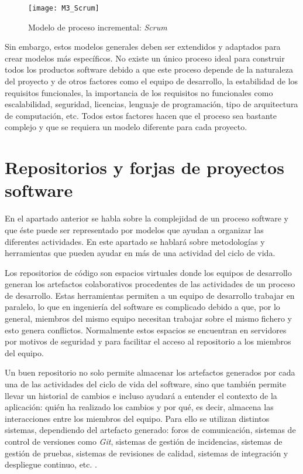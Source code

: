 \begin{figure}[!h]
	\centering
	\texttt{[image: M3\_Scrum]}
	\caption{Modelo de proceso incremental: \textit{Scrum} \cite{scrum_master_scrum_2019}}
	\label{fig:M3_Scrum}
\end{figure}
\FloatBarrier

Sin embargo, estos modelos generales deben ser extendidos y adaptados para crear modelos más específicos. No existe un único proceso ideal para construir todos los productos software debido a que este proceso depende de la naturaleza del proyecto y de otros factores como el equipo de desarrollo, la estabilidad de los requisitos funcionales, la importancia de los requisitos no funcionales como escalabilidad, seguridad, licencias, lenguaje de programación, tipo de arquitectura de computación, etc. Todos estos factores hacen que el proceso sea bastante complejo y que se requiera un modelo diferente para cada proyecto.


\section{Repositorios y forjas de proyectos software}
En el apartado anterior se habla sobre la complejidad de un proceso software y que éste puede ser representado por modelos que ayudan a organizar las diferentes actividades. En este apartado se hablará sobre metodologías y herramientas que pueden ayudar en más de una actividad del ciclo de vida.

Los repositorios de código son espacios virtuales donde los equipos de desarrollo generan los artefactos colaborativos procedentes de las actividades de un proceso de desarrollo. Estas herramientas permiten a un equipo de desarrollo trabajar en paralelo, lo que en ingeniería del software es complicado debido a que, por lo general, miembros del mismo equipo necesitan trabajar sobre el mismo fichero y esto genera conflictos. Normalmente estos espacios se encuentran en servidores por motivos de seguridad y para facilitar el acceso al repositorio a los miembros del equipo.

Un buen repositorio no solo permite almacenar los artefactos generados por cada una de las actividades del ciclo de vida del software, sino que también permite llevar un historial de cambios e incluso ayudará a entender el contexto de la aplicación: quién ha realizado los cambios y por qué, es decir, almacena las interacciones entre los miembros del equipo. Para ello se utilizan distintos sistemas, dependiendo del artefacto generado: foros de comunicación, sistemas de control de versiones como \textit{Git}, sistemas de gestión de incidencias, sistemas de gestión de pruebas, sistemas de revisiones de calidad, sistemas de integración y despliegue continuo, etc. \cite{guemes-pena_emerging_2018}.

